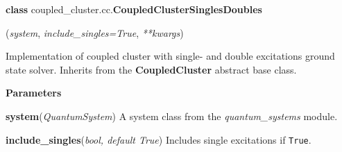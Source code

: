 \begin{tcolorbox}
    {\selectfont
    \textbf{class} coupled\_cluster.cc.\textbf{CoupledClusterSinglesDoubles}

    \hspace{1em}(\emph{system}, \emph{include\_singles=True}, \emph{**kwargs})

    \vspace{1em}
    Implementation of coupled cluster with single- and double excitations
    ground state solver. 
    Inherits from the \textbf{CoupledCluster} abstract base class.
    \vspace{1em}

    \textbf{Parameters}

    \hspace{2em}\textbf{system}(\emph{QuantumSystem}) A system class from the 
        \emph{quantum\_systems} module.

    \hspace{2em}\textbf{include\_singles}(\emph{bool, default True}) 
        Includes single excitations if \lstinline{True}.
    } 
\end{tcolorbox}